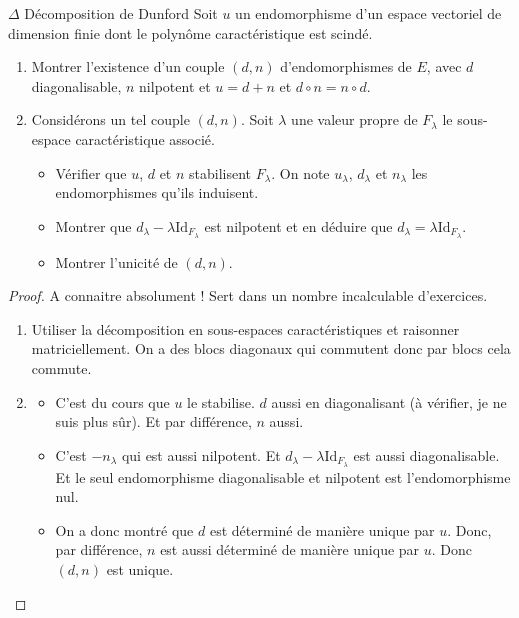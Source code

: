 \documentclass[french,a4paper]{article}
\theoremstyle{plain}
\theoremstyle{definition}
\theoremstyle{remark}
\begin{document}
\begin{ex}{$\Delta$ Décomposition de Dunford}
	Soit $u$ un endomorphisme d'un espace vectoriel de dimension finie dont le polynôme caractéristique est scindé.
	\begin{enumerate}
		\item Montrer l'existence d'un couple $(d,n)$ d'endomorphismes de $E$, avec $d$ diagonalisable, $n$ nilpotent et $u=d+n$ et $d\circ n=n\circ d$.
		\item Considérons un tel couple $(d,n)$. Soit $\lambda$ une valeur propre de $F_\lambda$ le sous-espace caractéristique associé.
		\begin{itemize}
			\item Vérifier que $u$, $d$ et $n$ stabilisent $F_\lambda$. On note $u_\lambda$, $d_\lambda$ et $n_\lambda$ les endomorphismes qu'ils induisent.
			\item Montrer que $d_\lambda-\lambda\text{Id}_{F_\lambda}$ est nilpotent et en déduire que $d_\lambda=\lambda\text{Id}_{F_\lambda}$.
			\item Montrer l'unicité de $(d,n)$. 
		\end{itemize}
	\end{enumerate}
\end{ex}
\begin{proof}
	A connaitre absolument ! Sert dans un nombre incalculable d'exercices.
	\begin{enumerate}
		\item Utiliser la décomposition en sous-espaces caractéristiques et raisonner matriciellement. On a des blocs diagonaux qui commutent donc par blocs cela commute.
		\item \begin{itemize}
			\item C'est du cours que $u$ le stabilise. $d$ aussi en diagonalisant (à vérifier, je ne suis plus sûr). Et par différence, $n$ aussi.
			\item C'est $-n_\lambda$ qui est aussi nilpotent. Et $d_\lambda-\lambda\text{Id}_{F_\lambda}$ est aussi diagonalisable. Et le seul endomorphisme diagonalisable et nilpotent est l'endomorphisme nul.
			\item On a donc montré que $d$ est déterminé de manière unique par $u$. Donc, par différence, $n$ est aussi déterminé de manière unique par $u$. Donc $(d,n)$ est unique.
		\end{itemize}
	\end{enumerate}
\end{proof}
\end{document}
